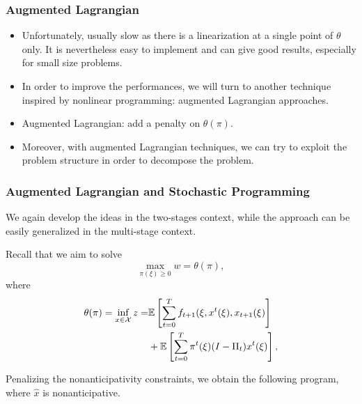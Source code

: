 \documentclass{beamer}
\begin{document}
\begin{frame}
\frametitle{Augmented Lagrangian}

\begin{itemize}
	\item 
Unfortunately, usually slow as there is a linearization at a single point of $\theta$ only. It is nevertheless easy to implement and can give good results, especially for small size problems.
\item 
In order to improve the performances, we will turn to another technique inspired by nonlinear programming: {\blue augmented Lagrangian} approaches.
\item 
Augmented Lagrangian: add a penalty on $\theta(\pi)$.
\item
Moreover, with augmented Lagrangian techniques, we can try to exploit the problem structure in order to decompose the problem.
\end{itemize}

\end{frame}






\begin{frame}
\frametitle{Augmented Lagrangian and Stochastic Programming}

We again develop the ideas in the two-stages context, while the approach can be easily generalized in the multi-stage context.

\mbox{}

Recall that we aim to solve
\[
\max_{\pi(\xi) \geq 0} w = \theta(\pi),
\]
where
\begin{align*}
\theta(\pi) = \inf_{x \in \mathcal{X}} z = & 
{\mathbb{E}}\left[\sum_{t = 0}^T f_{t+1} (\xi, x^t(\xi), x_{t+1}(\xi) \right] \\
& + {\mathbb{E}}\left[\sum_{t = 0}^T \pi^t(\xi)(I-\Pi_t)x^t(\xi) \right],
\end{align*}

Penalizing the nonanticipativity constraints, we obtain the following program, where $\hat{x}$ is nonanticipative.

\end{frame}
\end{document}
